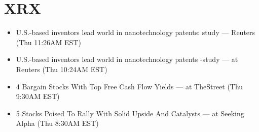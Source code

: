 \documentclass[11pt,asymmetric]{article}
\begin{document}
\section*{XRX}
\begin{itemize}
\item U.S.-based inventors lead world in nanotechnology patents: study --- Reuters (Thu 11:26AM EST)
\item U.S.-based inventors lead world in nanotechnology patents -study --- at Reuters (Thu 10:24AM EST)
\item 4 Bargain Stocks With Top Free Cash Flow Yields --- at TheStreet (Thu 9:30AM EST)
\item 5 Stocks Poised To Rally With Solid Upside And Catalysts --- at Seeking Alpha (Thu 8:30AM EST)
\end{itemize}
\end{document}
